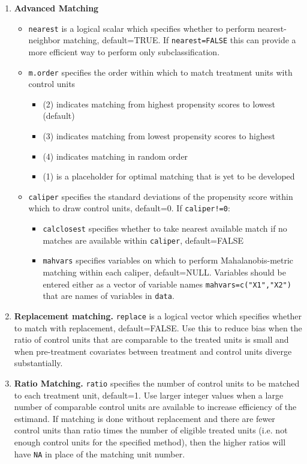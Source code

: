 \documentclass[oneside,letterpaper,titlepage]{article}
\begin{document}
\begin{enumerate}
\item \textbf{Advanced Matching}
  \begin{itemize}
  \item \texttt{nearest} is a logical scalar which specifies whether
    to perform nearest-neighbor matching, default=TRUE.  If
    \texttt{nearest=FALSE} this can provide a more efficient way to
    perform only subclassification. 
  \item \texttt{m.order}  specifies the order within which to match
    treatment units with control units
    \begin{itemize}
    \item (2) indicates matching from highest propensity scores to
      lowest (default)
    \item (3) indicates matching from lowest propensity scores to
      highest
    \item (4) indicates matching in random order
    \item (1) is a placeholder for optimal matching that is yet to be
      developed 
    \end{itemize}
  \item \texttt{caliper} specifies the standard deviations of 
    the propensity score within which to draw control units,
    default=0.  If \texttt{caliper!=0}: 
    \begin{itemize} 
    \item \texttt{calclosest} specifies whether to take nearest
      available match if no matches are available within
      \texttt{caliper}, default=FALSE 
    \item \texttt{mahvars} specifies
      variables on which to perform Mahalanobis-metric matching
      within each caliper, default=NULL.  Variables should be entered
      either as a vector of variable names
      \texttt{mahvars=c("X1","X2")} that are names of variables in
      \texttt{data}. 
    \end{itemize}
  \end{itemize}

\item \textbf{Replacement matching.} \texttt{replace} is a logical vector which specifies whether
  to match with replacement, default=FALSE.  Use this to reduce bias
  when the ratio of control units that are comparable to the treated units
  is small and when pre-treatment covariates between treatment and
  control units diverge substantially.  
  
\item \textbf{Ratio Matching.}  \texttt{ratio} specifies the number of
  control units to be matched to each treatment unit, default=1.  Use
  larger integer values when a large number of comparable control
  units are available to increase efficiency of the estimand. If
  matching is done without replacement and there are fewer control
  units than ratio times the number of eligible treated units (i.e.
  not enough control units for the specified method), then the higher
  ratios will have \texttt{NA} in place of the matching unit number.


\end{enumerate}
\end{document}
